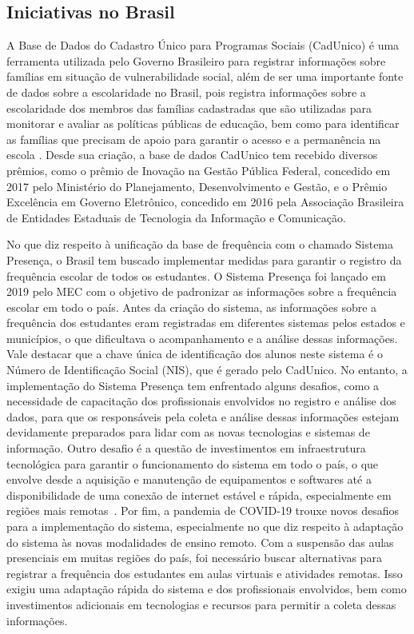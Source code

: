\subsection{Iniciativas no Brasil}
\label{sec:brasil}

A Base de Dados do Cadastro Único para Programas Sociais (CadUnico) é uma ferramenta utilizada pelo Governo Brasileiro para registrar informações sobre famílias em situação de vulnerabilidade social, além de ser uma importante fonte de dados sobre a escolaridade no Brasil, pois registra informações sobre a escolaridade dos membros das famílias cadastradas que são utilizadas para monitorar e avaliar as políticas públicas de educação, bem como para identificar as famílias que precisam de apoio para garantir o acesso e a permanência na escola \cite{garcia:2017}. Desde sua criação, a base de dados CadUnico tem recebido diversos prêmios, como o prêmio de Inovação na Gestão Pública Federal, concedido em 2017 pelo Ministério do Planejamento, Desenvolvimento e Gestão, e o Prêmio Excelência em Governo Eletrônico, concedido em 2016 pela Associação Brasileira de Entidades Estaduais de Tecnologia da Informação e Comunicação.

No que diz respeito à unificação da base de frequência com o chamado Sistema Presença, o Brasil tem buscado implementar medidas para garantir o registro da frequência escolar de todos os estudantes. O Sistema Presença foi lançado em 2019 pelo MEC com o objetivo de padronizar as informações sobre a frequência escolar em todo o país. Antes da criação do sistema, as informações sobre a frequência dos estudantes eram registradas em diferentes sistemas pelos estados e municípios, o que dificultava o acompanhamento e a análise dessas informações. Vale destacar que a chave única de identificação dos alunos neste sistema é o Número de Identificação Social (NIS), que é gerado pelo CadUnico. No entanto, a implementação do Sistema Presença tem enfrentado alguns desafios, como a necessidade de capacitação dos profissionais envolvidos no registro e análise dos dados, para que os responsáveis pela coleta e análise dessas informações estejam devidamente preparados para lidar com as novas tecnologias e sistemas de informação. Outro desafio é a questão de investimentos em infraestrutura tecnológica para garantir o funcionamento do sistema em todo o país, o que envolve desde a aquisição e manutenção de equipamentos e softwares até a disponibilidade de uma conexão de internet estável e rápida, especialmente em regiões mais remotas~\cite{echazarra2019learning}. Por fim, a pandemia de COVID-19 trouxe novos desafios para a implementação do sistema, especialmente no que diz respeito à adaptação do sistema às novas modalidades de ensino remoto. Com a suspensão das aulas presenciais em muitas regiões do país, foi necessário buscar alternativas para registrar a frequência dos estudantes em aulas virtuais e atividades remotas. Isso exigiu uma adaptação rápida do sistema e dos profissionais envolvidos, bem como investimentos adicionais em tecnologias e recursos para permitir a coleta dessas informações.


